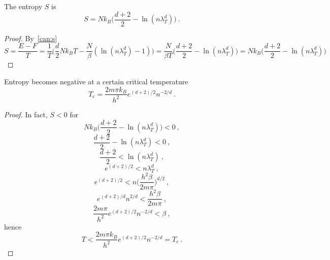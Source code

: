     The entropy $S$ is 
    \begin{equation*}
        S = N k_B \Big ( \frac{d+2}{2} - \ln (n \lambda_T^d) \Big ) ~.
    \end{equation*}
    \begin{proof}
        By~\eqref{can:s}
        \begin{equation*}
            S = \frac{E - F}{T} = \frac{1}{T} \Big ( \frac{d}{2} N k_B T - \frac{N}{\beta} (\ln (n \lambda_T^d) - 1) \Big ) = \frac{N}{\beta T} \Big ( \frac{d+2}{2} - \ln (n \lambda_T^d) \Big ) = N k_B \Big ( \frac{d+2}{2} - \ln (n \lambda_T^d) \Big )
        \end{equation*}
    \end{proof}

    Entropy becomes negative at a certain critical temperature
    \begin{equation*}
        T_c = \frac{2 m \pi k_B}{h^2} e^{(d+2)/2} n^{-2/d} ~.
    \end{equation*}
    \begin{proof}
        In fact, $S < 0$ for 
        \begin{equation*}
            N k_B \Big ( \frac{d+2}{2} - \ln (n \lambda_T^d) \Big ) < 0 ~,
        \end{equation*}
        \begin{equation*}
            \frac{d+2}{2} - \ln (n \lambda_T^d) < 0 ~,
        \end{equation*}
        \begin{equation*}
            \frac{d+2}{2} < \ln (n \lambda_T^d) ~,
        \end{equation*}
        \begin{equation*}
            e^{(d+2)/2} < n \lambda_T^d  ~,
        \end{equation*}
        \begin{equation*}
            e^{(d+2)/2} < n \Big ( \frac{h^2 \beta}{2 m \pi} \Big )^{d/2}  ~,
        \end{equation*}
        \begin{equation*}
            e^{(d+2)/d} n^{2/d} < \frac{h^2 \beta}{2 m \pi} ~,
        \end{equation*}
        \begin{equation*}
            \frac{2 m \pi}{h^2} e^{(d+2)/2} n^{-2/d} < \beta ~,
        \end{equation*}
        hence 
        \begin{equation*}
            T < \frac{2 m \pi k_B}{h^2} e^{(d+2)/2} n^{-2/d} = T_c ~.
        \end{equation*}
    \end{proof}
    

